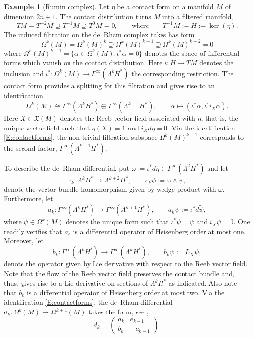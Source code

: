 \documentclass[reqno,12pt]{amsart}
\theoremstyle{plain}
\theoremstyle{definition}
\newtheorem{example}[theorem]{Example}
\begin{document}
\begin{example}[Rumin complex]\label{Ex:Rumin}
Let $\eta$ be a contact form on a manifold $M$ of dimension $2n+1$.
The contact distribution turns $M$ into a filtered manifold, 
$$
TM=T^{-2}M\supseteq T^{-1}M\supseteq T^0M=0,\qquad\text{where}\qquad T^{-1}M:=H:=\ker(\eta).
$$
The induced filtration on the de~Rham complex takes has form
$$
\Omega^k(M)=\Omega^k(M)^k\supseteq\Omega^k(M)^{k+1}\supseteq\Omega^k(M)^{k+2}=0
$$
where $\Omega^k(M)^{k+1}=\{\alpha\in\Omega^k(M):\iota^*\alpha=0\}$ denotes the space of differential forms which vanish on the contact distribution.
Here $\iota\colon H\to TM$ denotes the inclusion and $\iota^*\colon\Omega^k(M)\to\Gamma^\infty(\Lambda^kH^*)$ the corresponding restriction.
The contact form provides a splitting for this filtration and gives rise to an identification
\begin{equation}\label{E:contactforms}
\Omega^k(M)\cong\Gamma^\infty(\Lambda^kH^*)\oplus\Gamma^\infty(\Lambda^{k-1}H^*),\qquad\alpha\mapsto(\iota^*\alpha,\iota^*i_X\alpha).
\end{equation}
Here $X\in\mathfrak X(M)$ denotes the Reeb vector field associated with $\eta$, that is, the unique vector field such that $\eta(X)=1$ and $i_Xd\eta=0$.
Via the identification \eqref{E:contactforms}, the non-trivial filtration subspace $\Omega^k(M)^{k+1}$ corresponds to the second factor, $\Gamma^\infty(\Lambda^{k-1}H^*)$.


To describe the de~Rham differential, put $\omega:=\iota^*d\eta\in\Gamma^\infty(\Lambda^2H^*)$ and let 
$$
e_k\colon\Lambda^kH^*\to\Lambda^{k+2}H^*,\qquad
e_k\psi:=\omega\wedge\psi,
$$ 
denote the vector bundle homomorphism given by wedge product with $\omega$.
Furthermore, let 
$$
a_k\colon\Gamma^\infty(\Lambda^kH^*)\to\Gamma^\infty(\Lambda^{k+1}H^*),\qquad a_k\psi:=\iota^*d\tilde\psi,
$$ 
where $\tilde\psi\in\Omega^k(M)$ denotes the unique form such that $\iota^*\tilde\psi=\psi$ and $i_X\tilde\psi=0$. 
One readily verifies that $a_k$ is a differential operator of Heisenberg order at most one.
Moreover, let 
$$
b_k\colon\Gamma^\infty(\Lambda^kH^*)\to\Gamma^\infty(\Lambda^kH^*),\qquad b_k\psi:=L_X\psi,
$$ 
denote the operator given by Lie derivative with respect to the Reeb vector field.
Note that the flow of the Reeb vector field preserves the contact bundle and, thus, gives rise to a Lie derivative on sections of $\Lambda^kH^*$ as indicated.
Also note that $b_k$ is a differential operator of Heisenberg order at most two.
Via the identification \eqref{E:contactforms}, the de~Rham differential $d_k\colon\Omega^k(M)\to\Omega^{k+1}(M)$ takes the form, see \cite[Section~2]{R00},
$$
d_k=\begin{pmatrix}a_k&e_{k-1}\\b_k&-a_{k-1}\end{pmatrix}.
$$



\end{example}
\end{document}
